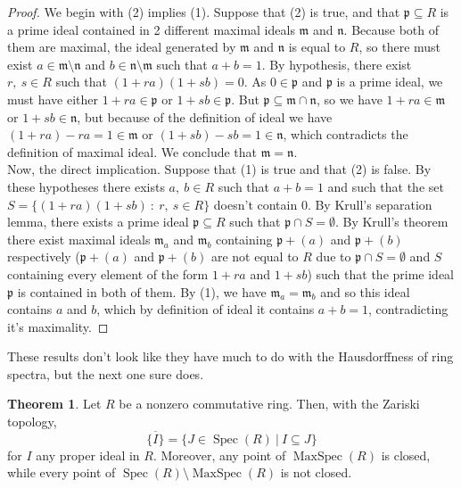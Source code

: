 \documentclass[a4paper]{book}
\theoremstyle{definition}
\newtheorem{theorem}{Theorem}[section]
\theoremstyle{ejemplo}
\theoremstyle{demostracion}
\DeclareMathOperator{\maxspec}{MaxSpec}
\DeclareMathOperator{\spec}{Spec}
\begin{document}
\begin{proof}
	We begin with (2) implies (1). Suppose that (2) is true, and that $\mathfrak{p} \subseteq R$ is a prime ideal contained in 2 different maximal ideals $\mathfrak{m}$ and $\mathfrak{n}$. Because both of them are maximal, the ideal generated by $\mathfrak{m}$ and $\mathfrak{n}$ is equal to $R$, so there must exist $a \in \mathfrak{m} \setminus \mathfrak{n}$ and $b \in \mathfrak{n} \setminus \mathfrak{m}$ such that $a + b = 1$. By hypothesis, there exist $r,\ s \in R$ such that $(1 + ra)(1 + sb) = 0$. As $0 \in \mathfrak{p}$ and $\mathfrak{p}$ is a prime ideal, we must have either $1 + ra \in \mathfrak{p}$ or $1 + sb \in \mathfrak{p}$. But $\mathfrak{p} \subseteq \mathfrak{m} \cap \mathfrak{n}$, so we have $1 + ra \in \mathfrak{m}$ or $1 + sb \in \mathfrak{n}$, but because of the definition of ideal we have $(1 + ra) - ra = 1\in \mathfrak{m}$ or $(1 + sb) - sb = 1\in \mathfrak{n}$, which contradicts the definition of maximal ideal. We conclude that $\mathfrak{m} = \mathfrak{n}$.\\ 
	Now, the direct implication. Suppose that (1) is true and that (2) is false. By these hypotheses there exists $a,\ b \in R$ such that $a + b = 1$ and such that the set $S = \{(1 + ra)(1 + sb)\ :\ r,\ s \in R \}$ doesn't contain $0$. By Krull's separation lemma, there exists a prime ideal $\mathfrak{p} \subseteq R$ such that $\mathfrak{p} \cap S = \emptyset$. By Krull's theorem there exist maximal ideals $\mathfrak{m}_a$ and $\mathfrak{m}_b$ containing $\mathfrak{p} + (a)$ and $\mathfrak{p} + (b)$ respectively ($\mathfrak{p} + (a)$ and $\mathfrak{p} + (b)$ are not equal to $R$ due to $\mathfrak{p} \cap S = \emptyset$ and $S$ containing every element of the form $1 + ra$ and $1 + sb$) such that the prime ideal $\mathfrak{p}$ is contained in both of them. By (1), we have $\mathfrak{m}_a = \mathfrak{m}_b$ and so this ideal contains $a$ and $b$, which by definition of ideal it contains $a + b = 1$, contradicting it's maximality.
\end{proof}

These results don't look like they have much to do with the Hausdorffness of ring spectra, but the next one sure does.

\begin{theorem}\label{thm:zariski_closure}
	Let $R$ be a nonzero commutative ring. Then, with the Zariski topology,
	\begin{equation*}
		\overline{\{I \}} = \{J \in \spec(R)\ |\ I \subseteq J\}
	\end{equation*}
	for $I$ any proper ideal in $R$. Moreover, any point of $\maxspec(R)$ is closed, while every point of $\spec(R) \setminus \maxspec(R)$ is not closed.
\end{theorem}
\end{document}
